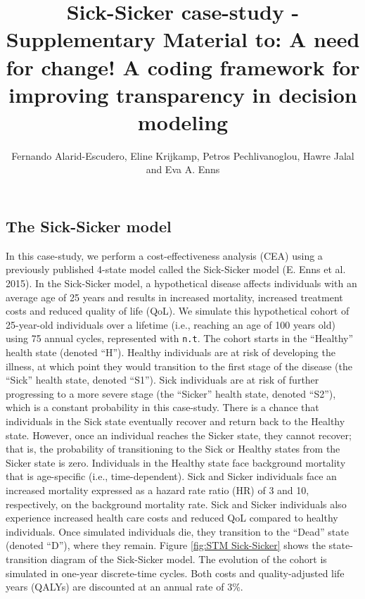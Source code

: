 \documentclass[]{article}
\title{Sick-Sicker case-study - Supplementary Material to: A need for change! A
coding framework for improving transparency in decision modeling}
\author{Fernando Alarid-Escudero, Eline Krijkamp, Petros Pechlivanoglou, Hawre
Jalal and Eva A. Enns}
\date{}
\begin{document}
\maketitle

\subsection{The Sick-Sicker model}\label{the-sick-sicker-model}

In this case-study, we perform a cost-effectiveness analysis (CEA) using
a previously published 4-state model called the Sick-Sicker model (E.
Enns et al. 2015). In the Sick-Sicker model, a hypothetical disease
affects individuals with an average age of 25 years and results in
increased mortality, increased treatment costs and reduced quality of
life (QoL). We simulate this hypothetical cohort of 25-year-old
individuals over a lifetime (i.e., reaching an age of 100 years old)
using 75 annual cycles, represented with \texttt{n.t}. The cohort starts
in the ``Healthy'' health state (denoted ``H''). Healthy individuals are
at risk of developing the illness, at which point they would transition
to the first stage of the disease (the ``Sick'' health state, denoted
``S1''). Sick individuals are at risk of further progressing to a more
severe stage (the ``Sicker'' health state, denoted ``S2''), which is a
constant probability in this case-study. There is a chance that
individuals in the Sick state eventually recover and return back to the
Healthy state. However, once an individual reaches the Sicker state,
they cannot recover; that is, the probability of transitioning to the
Sick or Healthy states from the Sicker state is zero. Individuals in the
Healthy state face background mortality that is age-specific (i.e.,
time-dependent). Sick and Sicker individuals face an increased mortality
expressed as a hazard rate ratio (HR) of 3 and 10, respectively, on the
background mortality rate. Sick and Sicker individuals also experience
increased health care costs and reduced QoL compared to healthy
individuals. Once simulated individuals die, they transition to the
``Dead'' state (denoted ``D''), where they remain. Figure
\ref{fig:STM Sick-Sicker} shows the state-transition diagram of the
Sick-Sicker model. The evolution of the cohort is simulated in one-year
discrete-time cycles. Both costs and quality-adjusted life years (QALYs)
are discounted at an annual rate of 3\%.
\end{document}
